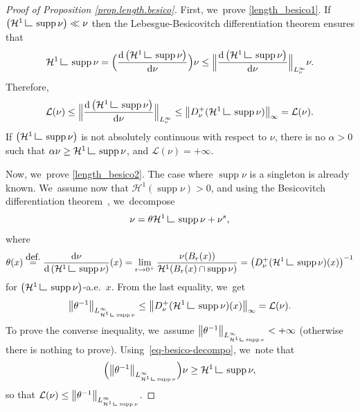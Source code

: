\documentclass[11pt]{article}
\numberwithin{equation}{section}
\theoremstyle{definition}
\newcommand{\eqdef}{\ensuremath{\stackrel{\mbox{\upshape\tiny def.}}{=}}}
\newcommand{\norm}[1]{\left\lVert#1\right\rVert}
\newcommand{\Bnorm}[1]{\Bigl\lVert#1\Bigr\rVert}
\newcommand\LM[1]{\hbox{\vrule width.5pt \vbox to#1pt{\vfill \hrule width#1pt height.5pt}}}
\newcommand\LL{{\mathchoice {\>\LM7\>}{\>\LM7\>}{\,\LM5\,}{\,\LM{3.35}\,}}}
\newcommand{\mres}{\LL}
\newcommand\cH{\mathcal{H}}
\DeclareMathOperator{\supp}{supp}
\newcommand\dd{\mathrm{d}}
\begin{document}
\begin{proof}[Proof of Proposition \ref{prop.length.besico}]
First, we~prove \eqref{length_besico1}. If $\left(\cH^1\mres \supp \nu\right) \ll \nu$ then the Lebesgue-Besicovitch differentiation theorem ensures that
\begin{equation*}
\cH^1\mres \supp \nu = \Bigl(\frac{\dd \left(\cH^1\mres \supp\nu\right)}{\dd \nu}\Bigr)\nu \leq \Bnorm{\frac{\dd \left(\cH^1\mres \supp\nu\right)}{\dd \nu}}_{L^{\infty}_\nu}\nu.
\end{equation*}
Therefore,
\begin{equation*}
\mathcal{L}(\nu)\leq \Bnorm{\frac{\dd \left(\cH^1\mres \supp\nu\right)}{\dd \nu}}_{L^{\infty}_\nu} \leq \norm{D^+_\nu(\cH^1\mres \supp\nu)}_{\infty}=\mathcal{L}(\nu).
\end{equation*}
If $\left(\cH^1\mres \supp \nu\right)$ is not absolutely continuous with respect to $\nu$, there is no $\alpha>0$ such that $\alpha \nu \geq \cH^1\mres \supp\nu$, and $\mathcal{L}(\nu)=+\infty$.

Now, we~prove \eqref{length_besico2}. The case where $\supp \nu$ is a singleton is already known. We~\hbox{assume} now that $\cH^1(\supp \nu)>0$, and using the Besicovitch differentiation theorem~\cite[Th.\,2.22]{ambrosio2000functions}, we~decompose
\begin{equation}
\nu = \theta\cH^1\mres \supp \nu + \nu^s,\label{eq-besico-decompo}
\end{equation}
where
\[
\theta(x)\eqdef \frac{\dd \nu}{\dd \left(\cH^1\mres \supp\nu\right)}(x)= \lim_{r \to 0^+} \frac{\nu(B_r(x))}{\cH^1(B_r(x)\cap \supp \nu)} =\left(D^+_\nu(\cH^1\mres \supp\nu)(x)\right)^{-1}
\]
for $\left(\cH^1\mres \supp\nu\right)$-a.e.\ $x$. From the last equality, we~get
\begin{equation*}
\norm{\theta^{-1}}_{L^{\infty}_{\cH^1\mres \supp\nu}} \leq \norm{D^+_\nu(\cH^1\mres \supp\nu)(x)}_\infty =\mathcal{L}(\nu).
\end{equation*}
To prove the converse inequality, we~assume $\norm{\theta^{-1}}_{L^{\infty}_{\cH^1\mres \supp\nu}}<+\infty$ (otherwise there is nothing to prove). Using~\eqref{eq-besico-decompo}, we~note that
\begin{equation*}
\Bigl(\norm{\theta^{-1}}_{L^{\infty}_{\cH^1\mres \supp\nu}}\Bigr)\nu \ge \cH^1\mres \supp\nu,
\end{equation*}
so that $\mathcal{L}(\nu)\le \norm{\theta^{-1}}_{L^{\infty}_{\cH^1\mres \supp\nu}}$.
\end{proof}
\end{document}
